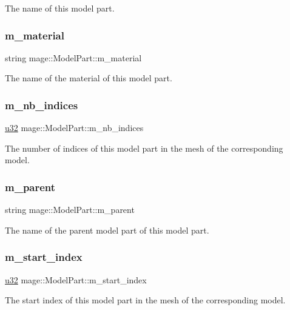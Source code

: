 The name of this model part. \hypertarget{structmage_1_1_model_part_a606603dd01b895cb1aa91b51089bf27f}{}\label{structmage_1_1_model_part_a606603dd01b895cb1aa91b51089bf27f} 
\subsubsection{\texorpdfstring{m\+\_\+material}{m\_material}}
{\footnotesize\ttfamily string mage\+::\+Model\+Part\+::m\+\_\+material}

The name of the material of this model part. \hypertarget{structmage_1_1_model_part_acb83657cacc4ed328dac0049a38cdd75}{}\label{structmage_1_1_model_part_acb83657cacc4ed328dac0049a38cdd75} 
\subsubsection{\texorpdfstring{m\+\_\+nb\+\_\+indices}{m\_nb\_indices}}
{\footnotesize\ttfamily \hyperlink{namespacemage_af2b398bf98eb10351f49cad73fe2cc73}{u32} mage\+::\+Model\+Part\+::m\+\_\+nb\+\_\+indices}

The number of indices of this model part in the mesh of the corresponding model. \hypertarget{structmage_1_1_model_part_ad4754bbb69d28885c09cef591d4d96c5}{}\label{structmage_1_1_model_part_ad4754bbb69d28885c09cef591d4d96c5} 
\subsubsection{\texorpdfstring{m\+\_\+parent}{m\_parent}}
{\footnotesize\ttfamily string mage\+::\+Model\+Part\+::m\+\_\+parent}

The name of the parent model part of this model part. \hypertarget{structmage_1_1_model_part_a94f1ee05790ef927c497807bca13202b}{}\label{structmage_1_1_model_part_a94f1ee05790ef927c497807bca13202b} 
\subsubsection{\texorpdfstring{m\+\_\+start\+\_\+index}{m\_start\_index}}
{\footnotesize\ttfamily \hyperlink{namespacemage_af2b398bf98eb10351f49cad73fe2cc73}{u32} mage\+::\+Model\+Part\+::m\+\_\+start\+\_\+index}

The start index of this model part in the mesh of the corresponding model. 